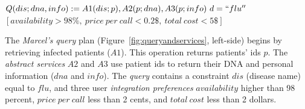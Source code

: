 \begin{center}
\small
$Q(dis; dna, info) := A1(dis; p), A2(p; dna), A3(p; info) \ d = ``flu'' $
\\
$[availability > 98\%, \ price \ per \ call < 0.2\$, \ total \ cost < 5\$]$
\end{center}

The \textit{Marcel's }\textit{query} plan (Figure~\ref{fig:queryandservices}, left-side) begins by retrieving infected patients ($A1$). This operation returns patients' ids $p$. The \textit{abstract services} $A2$ and $A3$ use patient ids to return their DNA and personal information ($dna$ and $info$).
The \textit{query} contains a constraint $dis$ (disease name) equal to $flu$, and three user \textit{integration preferences} $availability$ higher than 98 percent, $price \ per \ call$ less than 2 cents, and $total \ cost$ less than 2 dollars.
%
%

